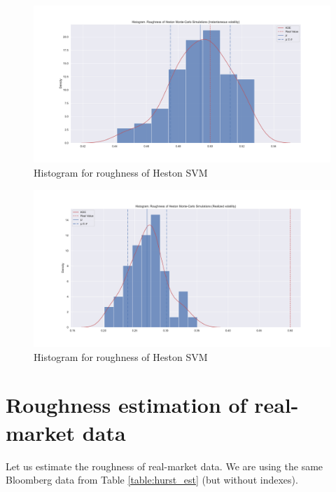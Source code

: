     \begin{figure}
        \centering
        \includegraphics[width=\linewidth]{fig/Histogram. Roughness of Heston Monte-Carlo Simulations (Instantaneous volatility).pdf}
        \caption{Histogram for roughness of Heston SVM}
    \end{figure}
    \begin{figure}
        \centering
        \includegraphics[width=\linewidth]{fig/Histogram. Roughness of Heston Monte-Carlo Simulations (Realized volatility).pdf}
        \caption{Histogram for roughness of Heston SVM}
    \end{figure}


\section{Roughness estimation of real-market data}

    Let us estimate the roughness of real-market data. 
    We are using the same Bloomberg data from Table \ref{table:hurst_est} (but without indexes).

